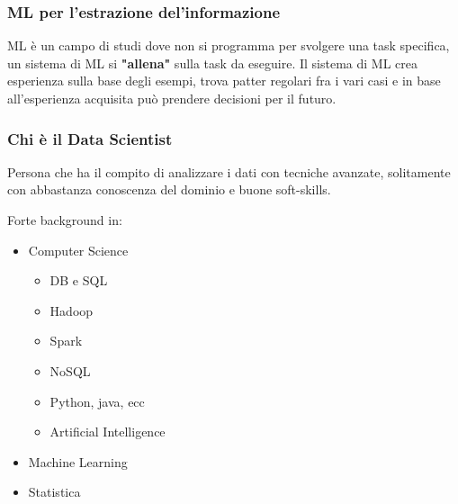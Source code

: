 \subsubsection{ML per l'estrazione del'informazione}
ML è un campo di studi dove non si programma per svolgere una task specifica, un 
sistema di ML si \textbf{"allena"} sulla task da eseguire.
Il sistema di ML crea esperienza sulla base degli esempi,
trova patter regolari fra i vari casi e in base all'esperienza acquisita
può prendere decisioni per il futuro.

\subsubsection{Chi è il Data Scientist}
Persona che ha il compito di analizzare i dati con tecniche avanzate,
solitamente con abbastanza conoscenza del dominio e buone soft-skills.

Forte background in:
\begin{itemize}
    \item Computer Science
    \begin{itemize}
        \item DB e SQL
        \item Hadoop
        \item Spark
        \item NoSQL
        \item Python, java, ecc
        \item Artificial Intelligence
    \end{itemize}
    \item Machine Learning
    \item Statistica
\end{itemize}



